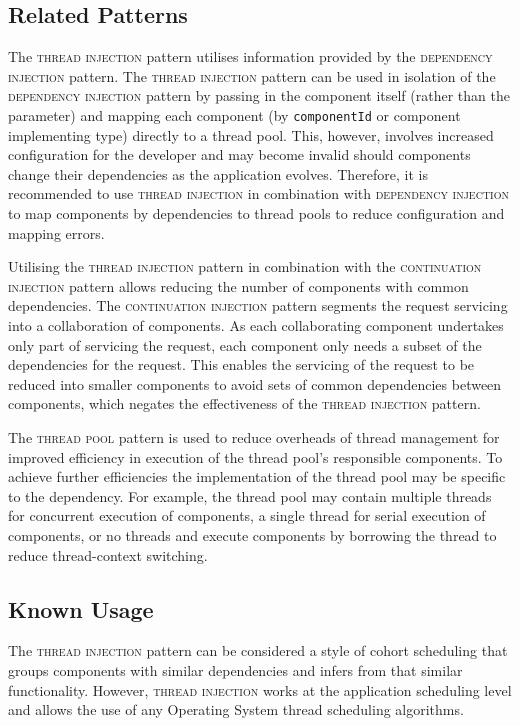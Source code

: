 \documentclass[prodmode]{style/acmlarge}
\begin{document}
\subsection{Related Patterns}

The \textsc{thread injection} pattern utilises information provided by the
\textsc{dependency injection} pattern.  The \textsc{thread injection} pattern
can be used in isolation of the \textsc{dependency injection} pattern by passing
in the component itself (rather than the parameter) and mapping each component
(by \texttt{componentId} or component implementing type) directly to a thread
pool.  This, however, involves increased configuration for the developer and may
become invalid should components change their dependencies as the application
evolves.  Therefore, it is recommended to use \textsc{thread injection} in
combination with \textsc{dependency injection} to map components by dependencies
to thread pools to reduce configuration and mapping errors.

Utilising the \textsc{thread injection} pattern in combination with the
\textsc{continuation injection} pattern allows reducing the number of components
with common dependencies.  The \textsc{continuation injection} pattern segments
the request servicing into a collaboration of components.  As each collaborating
component undertakes only part of servicing the request, each component only
needs a subset of the dependencies for the request.  This enables the servicing
of the request to be reduced into smaller components to avoid sets of common
dependencies between components, which negates the effectiveness of the
\textsc{thread injection} pattern.

The \textsc{thread pool} pattern \cite{thread-per-request} is used to reduce
overheads of thread management for improved efficiency in execution of the
thread pool's responsible components.  To achieve further efficiencies the
implementation of the thread pool may be specific to the dependency.  For
example, the thread pool may contain multiple threads for concurrent execution
of components, a single thread for serial execution of components, or no
threads and execute components by borrowing the thread to reduce thread-context
switching.


\subsection{Known Usage}

The \textsc{thread injection} pattern can be considered a style of cohort
scheduling \cite{cohort} that groups components with similar dependencies and
infers from that similar functionality.  However, \textsc{thread injection}
works at the application scheduling level and allows the use of any Operating
System thread scheduling algorithms.
\end{document}
